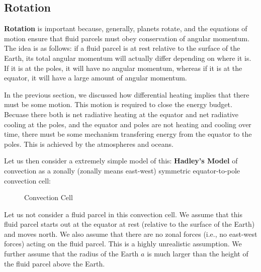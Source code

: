 \subsection{Rotation}

\textbf{Rotation} is important because, generally, planets rotate, and the equations of motion ensure that fluid parcels must obey conservation of angular momentum. The idea is as follows: if a fluid parcel is at rest relative to the surface of the Earth, its total angular momentum will actually differ depending on where it is. If it is at the poles, it will have no angular momentum, whereas if it is at the equator, it will have a large amount of angular momentum.

In the previous section, we discussed how differential heating implies that there must be some motion. This motion is required to close the energy budget. Becuase there both is net radiative heating at the equator and net radiative cooling at the poles, and the equator and poles are not heating and cooling over time, there must be some mechanism transfering energy from the equator to the poles. This is achieved by the atmospheres and oceans.

Let us then consider a extremely simple model of this: \textbf{Hadley's Model} of convection as a zonally (zonally means east-west) symmetric equator-to-pole convection cell:
\begin{figure}[H]
    \centering
    \caption{Convection Cell}
\end{figure}

Let us not consider a fluid parcel in this convection cell. We assume that this fluid parcel starts out at the equator at rest (relative to the surface of the Earth) and moves north. We also assume that there are no zonal forces (i.e., no east-west forces) acting on the fluid parcel. This is a highly unrealistic assumption. We further assume that the radius of the Earth $a$ is much larger than the height of the fluid parcel above the Earth.


